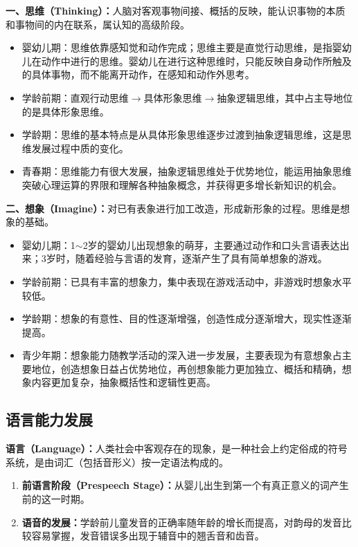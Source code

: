 \begin{keybox}
\textbf{一、思维（Thinking）：}人脑对客观事物间接、概括的反映，能认识事物的本质和事物间的内在联系，属认知的高级阶段。

\begin{itemize}[leftmargin=*]
    \item 婴幼儿期：思维依靠感知觉和动作完成；思维主要是直觉行动思维，是指婴幼儿在动作中进行的思维。婴幼儿在进行这种思维时，只能反映自身动作所触及的具体事物，而不能离开动作，在感知和动作外思考。
    \item 学龄前期：直观行动思维$\to$具体形象思维$\to$抽象逻辑思维，其中占主导地位的是具体形象思维。
    \item 学龄期：思维的基本特点是从具体形象思维逐步过渡到抽象逻辑思维，这是思维发展过程中质的变化。
    \item 青春期：思维能力有很大发展，抽象逻辑思维处于优势地位，能运用抽象思维突破心理运算的界限和理解各种抽象概念，并获得更多增长新知识的机会。
\end{itemize}

\textbf{二、想象（Imagine）：}对已有表象进行加工改造，形成新形象的过程。思维是想象的基础。

\begin{itemize}[leftmargin=*]
    \item 婴幼儿期：1$\sim$2岁的婴幼儿出现想象的萌芽，主要通过动作和口头言语表达出来；3岁时，随着经验与言语的发育，逐渐产生了具有简单想象的游戏。
    \item 学龄前期：已具有丰富的想象力，集中表现在游戏活动中，非游戏时想象水平较低。
    \item 学龄期：想象的有意性、目的性逐渐增强，创造性成分逐渐增大，现实性逐渐提高。
    \item 青少年期：想象能力随教学活动的深入进一步发展，主要表现为有意想象占主要地位，创造想象日益占优势地位，再创想象能力更加独立、概括和精确，想象内容更加复杂，抽象概括性和逻辑性更高。
\end{itemize}
\end{keybox}

\subsection{语言能力发展}

\begin{keybox}
\textbf{语言（Language）：}人类社会中客观存在的现象，是一种社会上约定俗成的符号系统，是由词汇（包括音形义）按一定语法构成的。

\begin{enumerate}[leftmargin=*]
    \item \textbf{前语言阶段（Prespeech Stage）：}从婴儿出生到第一个有真正意义的词产生前的这一时期。
    \item \textbf{语音的发展：}学龄前儿童发音的正确率随年龄的增长而提高，对韵母的发音比较容易掌握，发音错误多出现于辅音中的翘舌音和齿音。
\end{enumerate}
\end{keybox}

